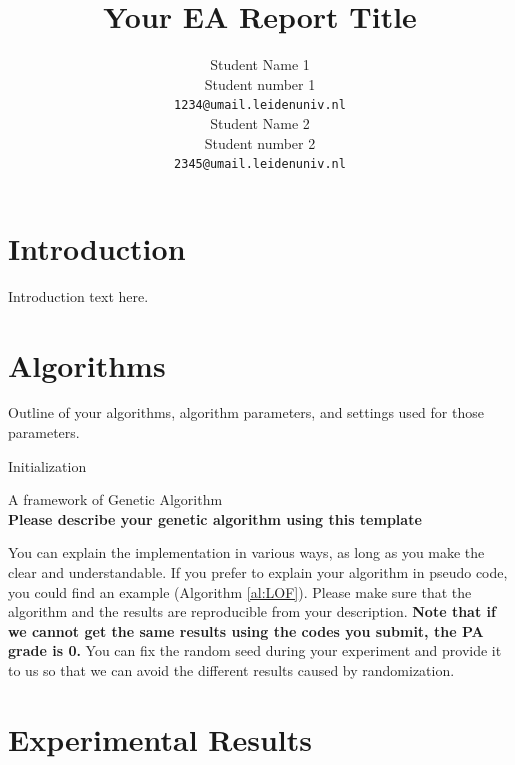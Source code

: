 \documentclass{article}
\title{Your EA Report Title}
\author{
 Student Name 1\\
  Student number 1\\
  \texttt{1234@umail.leidenuniv.nl}\\
   \And
 Student Name 2\\
  Student number 2\\
  \texttt{2345@umail.leidenuniv.nl} \\
}
\newcommand{\note}[1]{\textbf{#1}}
\begin{document}
\maketitle




\section{Introduction}\label{sec:intro}

Introduction text here.

\section{Algorithms}
\label{sec:imple}

Outline of your algorithms, algorithm parameters, and settings used for those parameters. 

\begin{algorithm}[!ht]
\SetAlgoLined
{}

\BlankLine

Initialization\;

\caption{A framework of Genetic Algorithm \\\note{Please describe your genetic algorithm using this template}}\label{al:LOF}
\end{algorithm}
 
You can explain the implementation in various ways, as long as you make the clear and understandable. If you prefer to explain your algorithm in pseudo code, you could find an example (Algorithm \ref{al:LOF}). Please make sure that the algorithm and the results are reproducible from your description. \note{Note that if we cannot get the same results using the codes you submit, the PA grade is 0.} You can fix the random seed during your experiment and provide it to us so that we can avoid the different results caused by randomization. 




\section{Experimental Results}\label{sec:experi}
\end{document}
